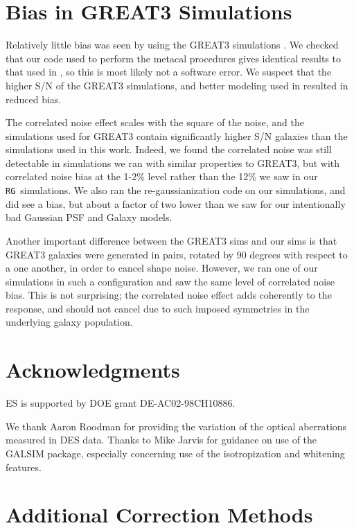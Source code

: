 \documentclass[usegraphicx,usenatbib]{mn2e}
\newcommand{\rgsim}{\texttt{RG}}
\begin{document}
\section{Bias in GREAT3 Simulations}

Relatively little bias was seen by \cite{HuffMcal} using the GREAT3 simulations
\citep{great3}.  We checked that our code used to perform the metacal
procedures gives identical results to that used in \cite{HuffMcal}, so this is
most likely not a software error.  We
suspect that the higher S/N of the GREAT3 simulations, and better modeling used
in \cite{HuffMcal} resulted in reduced bias.

The correlated noise effect scales with the square of the noise, and the
simulations used for GREAT3 contain significantly higher S/N galaxies than the
simulations used in this work.  Indeed, we found the correlated noise was still
detectable in simulations we ran with similar properties to GREAT3, but with
correlated noise bias at the 1-2\% level rather than the 12\% we saw in our
\rgsim\ simulations.  We also ran the re-gaussianization code on our
simulations, and did see a bias, but about a factor of two lower than we saw
for our intentionally bad Gaussian PSF and Galaxy models.

Another important difference between the GREAT3 sims and our sims is that
GREAT3 galaxies were generated in pairs, rotated by 90 degrees with respect to
a one another, in order to cancel shape noise.  However, we ran one of our
simulations in such a configuration and saw the same level of correlated noise
bias.  This is not surprising; the correlated noise effect adds coherently to
the response, and should not cancel due to such imposed symmetries in the
underlying galaxy population.

\section*{Acknowledgments}

ES is supported by DOE grant DE-AC02-98CH10886.

We thank Aaron Roodman for providing the variation of the optical aberrations
measured in DES data.  Thanks to Mike Jarvis for guidance on use of the GALSIM
package, especially concerning use of the isotropization and whitening features.


\appendix

\section{Additional Correction Methods} \label{sec:altcorr}
\end{document}
